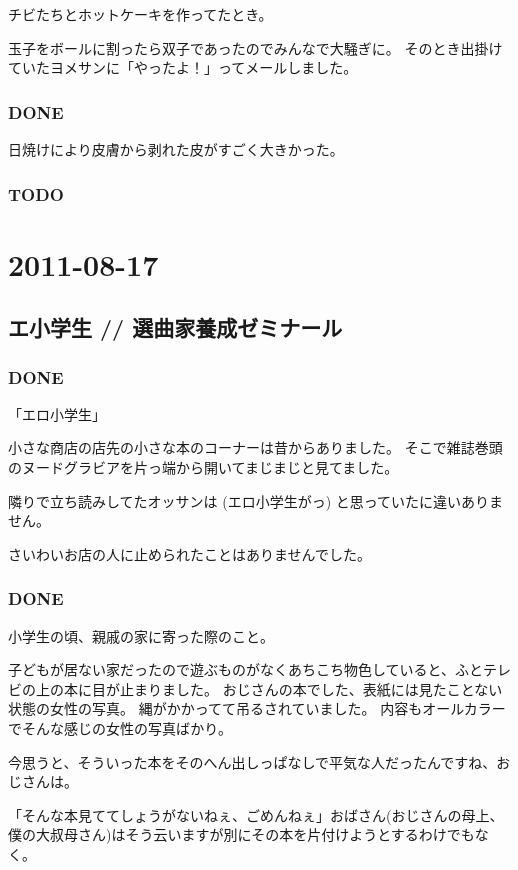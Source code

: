 \documentclass[11pt]{article}
\begin{document}
チビたちとホットケーキを作ってたとき。

玉子をボールに割ったら双子であったのでみんなで大騒ぎに。
そのとき出掛けていたヨメサンに「やったよ！」ってメールしました。
\subsubsection{\textbf{DONE}}
\label{sec-82_1_3}

日焼けにより皮膚から剥れた皮がすごく大きかった。
\subsubsection{\textbf{TODO}}
\label{sec-82_1_4}
\section{2011-08-17}
\label{sec-83}
\subsection{エ小学生 // 選曲家養成ゼミナール}
\label{sec-83_1}
\subsubsection{\textbf{DONE}}
\label{sec-83_1_1}

「エロ小学生」

小さな商店の店先の小さな本のコーナーは昔からありました。
そこで雑誌巻頭のヌードグラビアを片っ端から開いてまじまじと見てました。

隣りで立ち読みしてたオッサンは (エロ小学生がっ) と思っていたに違いありません。

さいわいお店の人に止められたことはありませんでした。
\subsubsection{\textbf{DONE}}
\label{sec-83_1_2}

小学生の頃、親戚の家に寄った際のこと。

子どもが居ない家だったので遊ぶものがなくあちこち物色していると、ふとテレビの上の本に目が止まりました。
おじさんの本でした、表紙には見たことない状態の女性の写真。
縄がかかってて吊るされていました。
内容もオールカラーでそんな感じの女性の写真ばかり。

今思うと、そういった本をそのへん出しっぱなしで平気な人だったんですね、おじさんは。

「そんな本見ててしょうがないねぇ、ごめんねぇ」おばさん(おじさんの母上、僕の大叔母さん)はそう云いますが別にその本を片付けようとするわけでもなく。
\end{document}
